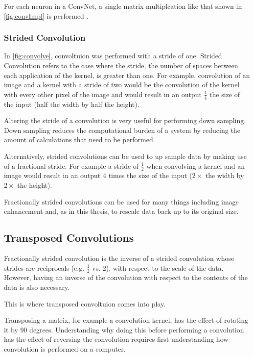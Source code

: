 For each neuron in a ConvNet, a single matrix multiplcation like that shown in \autoref{fig:convImpl} is performed .

\subsubsection{Strided Convolution}
In \autoref{fig:convolve}, convoltuion was performed with a stride of one. Strided Convolution refers to the case where the stride, the number of spaces between each application of the kernel, is greater than one. For example, convolution of an image and a kernel with a stride of two would be the convolution of the kernel with every other pixel of the image and would result in an output $\frac{1}{4}$ the size of the input (half the width by half the height).

Altering the stride of a convolution is very useful for performing down sampling. Down sampling reduces the computational burden of a system by reducing the amount of calculations that need to be performed.

Alternatively, strided convolutions can be used to up sample data by making use of a fractional stride. For example a stride of $\frac{1}{2}$ when convolving a kernel and an image would result in an output 4 times the size of the input ($2\times$ the width by $2\times$ the height).

Fractionally strided convolutions can be used for many things including image enhancement\cite{radford2015unsupervised} and, as in this thesis, to rescale data back up to its original size.

\subsection{Transposed Convolutions}
Fractionally strided convolution is the inverse of a strided convolution whose strides are reciprocals (e.g. $\frac{1}{2}$ vs. 2), with respect to the scale of the data. However, having an inverse of the convolution with respect to the contents of the data is also necessary.

This is where transposed convoltuion comes into play. 

Transposing a matrix, for example a convolution kernel, has the effect of rotating it by 90 degrees. Understanding why doing this before performing a convolution has the effect of reversing the convolution requires first understanding how convolution is performed on a computer.


